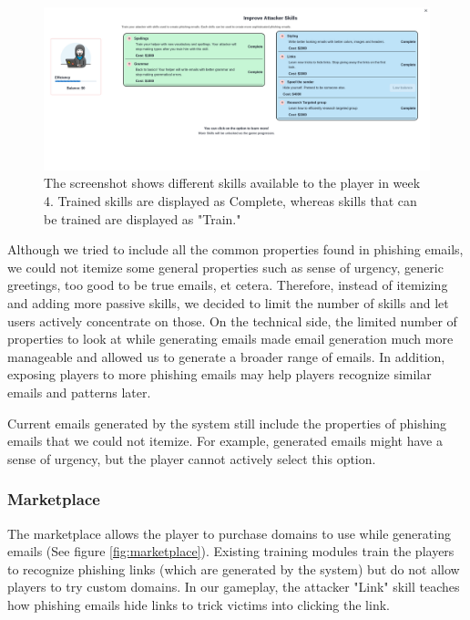 \begin{figure}[!ht]
    \centering
    \includegraphics[width=\textwidth]{figures/section2/attacker.png}
    \caption[Screenshot of the attacker module on week 4]{The screenshot shows different skills available to the player in week 4. Trained skills are displayed as Complete, whereas skills that can be trained are displayed as "Train."}
    \label{fig:attacker}
\end{figure}

Although we tried to include all the common properties found in phishing emails, we could not itemize some general properties such as sense of urgency, generic greetings, too good to be true emails, et cetera. Therefore, instead of itemizing and adding more passive skills, we decided to limit the number of skills and let users actively concentrate on those. On the technical side, the limited number of properties to look at while generating emails made email generation much more manageable and allowed us to generate a broader range of emails. In addition, exposing players to more phishing emails may help players recognize similar emails and patterns later.

Current emails generated by the system still include the properties of phishing emails that we could not itemize. For example, generated emails might have a sense of urgency, but the player cannot actively select this option.

\subsubsection{Marketplace}
The marketplace allows the player to purchase domains to use while generating emails (See figure \ref{fig:marketplace}). Existing training modules train the players to recognize phishing links (which are generated by the system) but do not allow players to try custom domains. In our gameplay, the attacker "Link" skill teaches how phishing emails hide links to trick victims into clicking the link.

